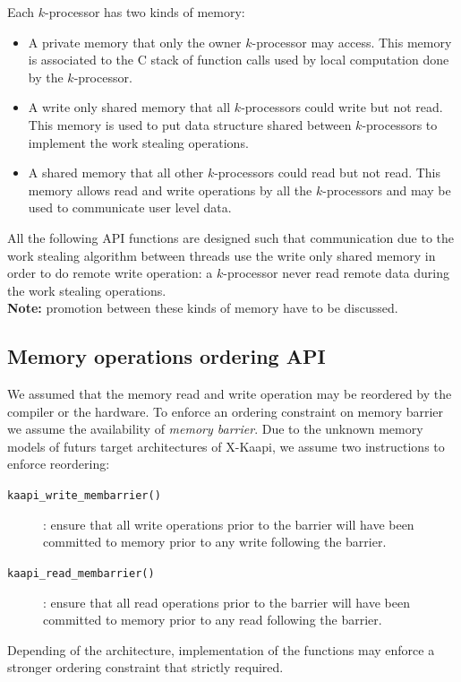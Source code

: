 \documentclass{report}
\newcommand{\kaapi}{\textsc{X}-Kaapi\xspace}
\begin{document}
Each $k$-processor has two kinds of memory:
\begin{itemize}
\item A private memory that only the owner $k$-processor may access. This memory is associated to the C stack of function calls used by local computation done by the $k$-processor.
\item A write only shared memory that all $k$-processors could write but not read. This memory is used to put data structure shared between $k$-processors to implement the work stealing operations.
\item A shared memory that all other $k$-processors could read but not read. This memory allows read and write operations by all the $k$-processors and may be used to communicate user level data.
\end{itemize}
All the following API functions are designed such that communication due to the work stealing algorithm between threads use the write only shared memory in order to do remote write operation: a $k$-processor never read remote data during the work stealing operations.\\

\noindent\textbf{Note:} promotion between these kinds of memory have to be discussed.\\

\subsection{Memory operations ordering API}
We assumed that the memory read and write operation may be reordered by the compiler or the hardware. To enforce an ordering constraint on memory barrier we assume the availability of \textit{memory barrier}. Due to the unknown memory models of futurs target architectures of \kaapi, we assume two instructions to enforce reordering:
\begin{description}
\item [\texttt{kaapi\_write\_membarrier()}]: ensure that all  write operations prior to the barrier will have been committed to memory prior to any write following the barrier.
\item [\texttt{kaapi\_read\_membarrier()}]: ensure that all  read operations prior to the barrier will have been committed to memory prior to any read following the barrier.
\end{description}
Depending of the architecture, implementation of the functions may enforce a stronger ordering constraint that strictly required.
\end{document}
